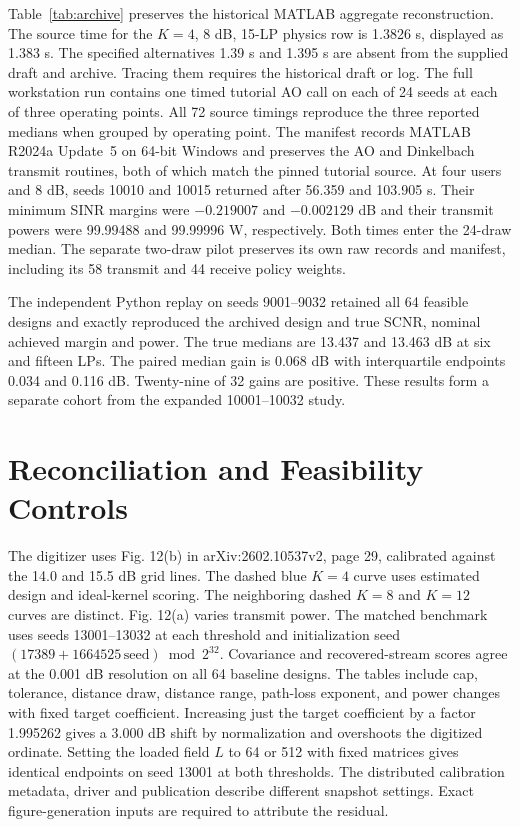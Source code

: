 \documentclass[journal]{IEEEtran}
\begin{document}
Table~\ref{tab:archive} preserves the historical MATLAB aggregate reconstruction. The source time for the \(K=4\), 8 dB, 15-LP physics row is 1.3826 s, displayed as 1.383 s. The specified alternatives 1.39 s and 1.395 s are absent from the supplied draft and archive. Tracing them requires the historical draft or log. The full workstation run contains one timed tutorial AO call on each of 24 seeds at each of three operating points. All 72 source timings reproduce the three reported medians when grouped by operating point. The manifest records MATLAB R2024a Update~5 on 64-bit Windows and preserves the AO and Dinkelbach transmit routines, both of which match the pinned tutorial source. At four users and 8 dB, seeds 10010 and 10015 returned after 56.359 and 103.905 s. Their minimum SINR margins were \(-0.219007\) and \(-0.002129\) dB and their transmit powers were 99.99488 and 99.99996 W, respectively. Both times enter the 24-draw median. The separate two-draw pilot preserves its own raw records and manifest, including its 58 transmit and 44 receive policy weights.

The independent Python replay on seeds 9001--9032 retained all 64 feasible designs and exactly reproduced the archived design and true SCNR, nominal achieved margin and power. The true medians are 13.437 and 13.463 dB at six and fifteen LPs. The paired median gain is 0.068 dB with interquartile endpoints 0.034 and 0.116 dB. Twenty-nine of 32 gains are positive. These results form a separate cohort from the expanded 10001--10032 study.

\section{Reconciliation and Feasibility Controls}
The digitizer uses Fig. 12(b) in arXiv:2602.10537v2, page 29, calibrated against the 14.0 and 15.5 dB grid lines. The dashed blue \(K=4\) curve uses estimated design and ideal-kernel scoring. The neighboring dashed \(K=8\) and \(K=12\) curves are distinct. Fig. 12(a) varies transmit power. The matched benchmark uses seeds 13001--13032 at each threshold and initialization seed \((17389+1664525\,\mathrm{seed})\bmod 2^{32}\). Covariance and recovered-stream scores agree at the 0.001 dB resolution on all 64 baseline designs. The tables include cap, tolerance, distance draw, distance range, path-loss exponent, and power changes with fixed target coefficient. Increasing just the target coefficient by a factor 1.995262 gives a 3.000 dB shift by normalization and overshoots the digitized ordinate. Setting the loaded field \(L\) to 64 or 512 with fixed matrices gives identical endpoints on seed 13001 at both thresholds. The distributed calibration metadata, driver and publication describe different snapshot settings. Exact figure-generation inputs are required to attribute the residual.
\end{document}
